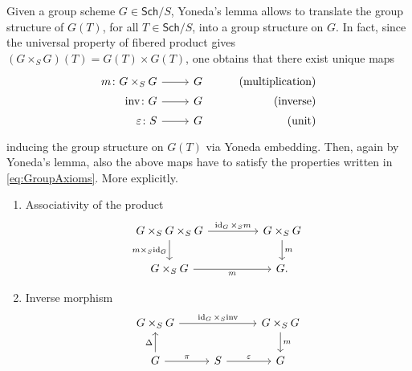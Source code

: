 \begin{rem}[]\label{rem:StructuralMorphisms}
	Given a group scheme $G \in \mathsf{Sch}/S$, Yoneda's lemma allows to translate
	the group structure of $G(T)$, for all $T \in \mathsf{Sch}/S$, into a group structure on $G$.
	In fact, since the universal property of
	fibered product gives $\left( G \times_{ S } G \right)(T) = G(T) \times G(T)$,
	one obtains that there exist unique maps
	\begin{equation*}
			\begin{tikzcd}[row sep = 0ex
         ,/tikz/column 1/.append style={anchor=base east}
         ,/tikz/column 2/.append style={anchor=base west}
         ,/tikz/column 3/.append style={anchor=base east}]
			m\colon G \times_{ S } G \arrow[r, "", rightarrow] &
			G & \text{(multiplication)} \\
			\phantom{\times_S} \mathrm{inv}\colon G \arrow[r, "", rightarrow] &
			G & \text{(inverse)} \\
			\varepsilon \colon S \arrow[r, "", rightarrow] &
			G & \text{(unit)} 
		\end{tikzcd}
	\end{equation*} 
	inducing the group structure on $G(T)$ via Yoneda embedding.
	Then, again by Yoneda's lemma, also the above maps have to
	satisfy the properties written in 
	\cref{eq:GroupAxioms}.
	More explicitly.
	\begin{enumerate}
		\item Associativity of the product
			\begin{equation*}
			\begin{tikzcd}[column sep=4.5em]
				G \times_{ S } G \times_{ S } G 
				\arrow[r, "\id_{ G } \times_S m", rightarrow] 
				\arrow[d, "m \times_S \id_{ G }"', rightarrow] &
				G \times_{ S } G \arrow[d, "m", rightarrow] \\
				G \times_{ S } G \arrow[r, "m"', rightarrow] &
				G.
			\end{tikzcd}
			\end{equation*} 
		\item Inverse morphism 
			\begin{equation*}
			\begin{tikzcd}[column sep=2.7em]
				G \times_{ S } G
				\arrow[rr, "\id_{ G } \times_S \mathrm{inv}", rightarrow] & &
				G \times_{ S } G \arrow[d, "m", rightarrow] \\
				G \arrow[u, "\Delta", rightarrow] 
				\arrow[r, "\pi", rightarrow] &
				S \arrow[r, "\varepsilon", rightarrow] & 
				G
			\end{tikzcd}

\end{equation*}
\end{enumerate}
\end{rem}
